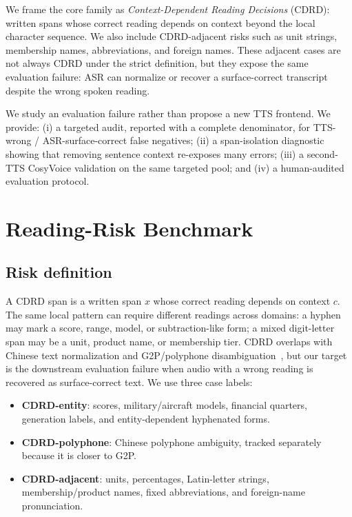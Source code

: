 \documentclass{article}
\begin{document}
We frame the core family as \emph{Context-Dependent Reading Decisions} (CDRD): written spans whose correct reading depends on context beyond the local character sequence. We also include CDRD-adjacent risks such as unit strings, membership names, abbreviations, and foreign names. These adjacent cases are not always CDRD under the strict definition, but they expose the same evaluation failure: ASR can normalize or recover a surface-correct transcript despite the wrong spoken reading.

We study an evaluation failure rather than propose a new TTS frontend. We provide: (i) a targeted audit, reported with a complete denominator, for TTS-wrong / ASR-surface-correct false negatives; (ii) a span-isolation diagnostic showing that removing sentence context re-exposes many errors; (iii) a second-TTS CosyVoice validation on the same targeted pool; and (iv) a human-audited evaluation protocol.

\section{Reading-Risk Benchmark}

\subsection{Risk definition}

A CDRD span is a written span $x$ whose correct reading depends on context $c$. The same local pattern can require different readings across domains: a hyphen may mark a score, range, model, or subtraction-like form; a mixed digit-letter span may be a unit, product name, or membership tier. CDRD overlaps with Chinese text normalization and G2P/polyphone disambiguation~\cite{dai2022flattn,choi2021g2p}, but our target is the downstream evaluation failure when audio with a wrong reading is recovered as surface-correct text. We use three case labels:
\begin{itemize}
\item \textbf{CDRD-entity}: scores, military/aircraft models, financial quarters, generation labels, and entity-dependent hyphenated forms.
\item \textbf{CDRD-polyphone}: Chinese polyphone ambiguity, tracked separately because it is closer to G2P.
\item \textbf{CDRD-adjacent}: units, percentages, Latin-letter strings, membership/product names, fixed abbreviations, and foreign-name pronunciation.
\end{itemize}
\end{document}
